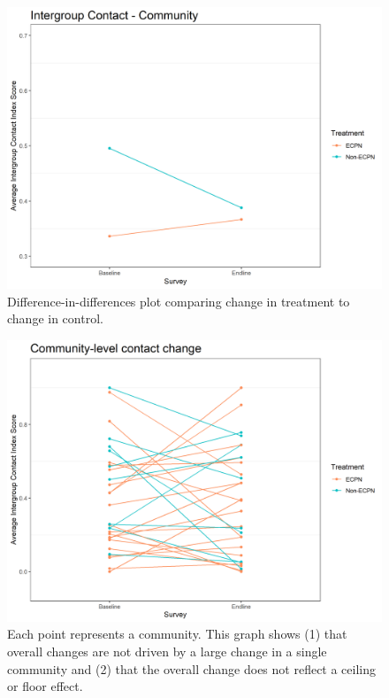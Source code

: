 \documentclass[
]{article}
\begin{document}
\begin{figure}[H]
\centering
\includegraphics[width=\linewidth]{../data_and_code/survey_dat/figs/did_plots/finished_didPlots/conComm_plot.png}
\caption{Difference-in-differences plot comparing change in treatment to change in control.}\label{fig:con_comm}
\end{figure}

\begin{figure}[H]
\centering
\includegraphics[width=\linewidth]{../data_and_code/survey_dat/figs/did_plots/conComm_plot_disag.png}
\caption{Each point represents a community. This graph shows (1) that overall changes are not driven by a large change in a single community and (2) that the overall change does not reflect a ceiling or floor effect.}\label{fig:con_comm_dis}
\end{figure}
\end{document}
